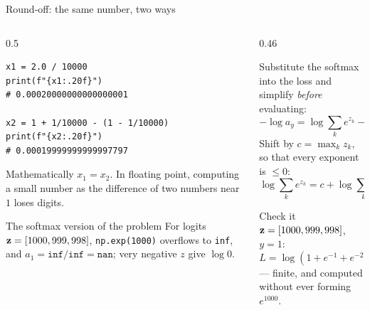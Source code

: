 \documentclass[aspectratio=169,10pt]{beamer}
\begin{document}
\begin{frame}[fragile]{Round-off: the same number, two ways}
  \begin{columns}[T,onlytextwidth]
    \begin{column}{0.5\textwidth}
\begin{lstlisting}
x1 = 2.0 / 10000
print(f"{x1:.20f}")
# 0.00020000000000000001

x2 = 1 + 1/10000 - (1 - 1/10000)
print(f"{x2:.20f}")
# 0.00019999999999997797
\end{lstlisting}
      \footnotesize
      Mathematically $x_1=x_2$. In floating point, computing a small number as the
      difference of two numbers near $1$ loses digits.
      \begin{block}{The softmax version of the problem}
        For logits $\mathbf{z}=[1000,999,998]$, \texttt{np.exp(1000)} overflows to \texttt{inf},
        and $a_1=\texttt{inf}/\texttt{inf}=\texttt{nan}$; very negative $z$ give $\log 0$.
      \end{block}
    \end{column}
    \begin{column}{0.46\textwidth}
      \footnotesize
      \begin{keyidea}
        Substitute the softmax into the loss and simplify \emph{before} evaluating:
        \[ -\log a_y = \log\sum_{k}e^{z_k}-z_y. \]
        Shift by $c=\max_k z_k$, so that every exponent is $\le 0$:
        \[ \log\sum_k e^{z_k} = c+\log\sum_k e^{z_k-c}. \]
      \end{keyidea}
      \begin{block}{Check it}
        $\mathbf{z}=[1000,999,998]$, $y=1$:
        \[ L=\log(1+e^{-1}+e^{-2})=0.4076 \]
        --- finite, and computed without ever forming $e^{1000}$.
      \end{block}
    \end{column}
  \end{columns}
\end{frame}
\end{document}
